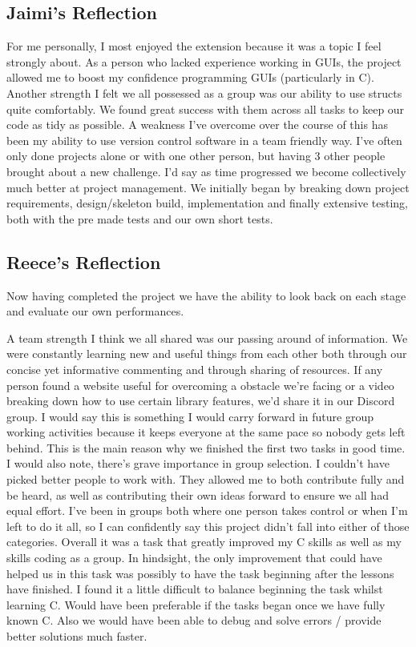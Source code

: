 \documentclass{article}
\begin{document}
\subsection{Jaimi's Reflection}
For me personally, I most enjoyed the extension because it was a topic I feel strongly about. As a person who lacked experience working in GUIs, the project allowed me to boost my confidence programming GUIs (particularly in C). Another strength I felt we all possessed as a group was our ability to use structs quite comfortably. We found great success with them across all tasks to keep our code as tidy as possible. 
A weakness I’ve overcome over the course of this has been my ability to use version control software in a team friendly way. I’ve often only done projects alone or with one other person, but having 3 other people brought about a new challenge. I’d say as time progressed we become collectively much better at project management. We initially began by breaking down project requirements, design/skeleton build, implementation and finally extensive testing, both with the pre made tests and our own short tests. 

\subsection{Reece's Reflection}
Now having completed the project we have the ability to look back on each stage and evaluate our own performances.

A team strength I think we all shared was our passing around of information. We were constantly learning new and useful things from each other both through our concise yet informative commenting and through sharing of resources. If any person found a website useful for overcoming a obstacle we’re facing or a video breaking down how to use certain library features, we’d share it in our Discord group. I would say this is something I would carry forward in future group working activities because it keeps everyone at the same pace so nobody gets left behind. This is the main reason why we finished the first two tasks in good time.
I would also note, there’s grave importance in group selection. I couldn’t have picked better people to work with. They allowed me to both contribute fully and be heard, as well as contributing their own ideas forward to ensure we all had equal effort. I’ve been in groups both where one person takes control or when I’m left to do it all, so I can confidently say this project didn’t fall into either of those categories. 
Overall it was a task that greatly improved my C skills as well as my skills coding as a group. In hindsight, the only improvement that could have helped us in this task was possibly to have the task beginning after the lessons have finished. I found it a little difficult to balance beginning the task whilst learning C. Would have been preferable if the tasks began once we have fully known C. Also we would have been able to debug and solve errors / provide better solutions much faster.
\end{document}
